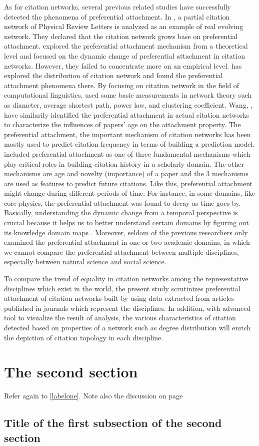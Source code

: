 \documentclass{article}
\begin{document}
As for citation networks, several previous related studies have successfully detected the phenomena of preferential attachment. In \cite{jeong2003measuring}, a partial citation network of Physical Review Letters is analyzed as an example of real evolving network. They declared that the citation network grows base on preferential attachment. \cite{wang2008measuring} explored the preferential attachment mechanism from a theoretical level and focused on the dynamic change of preferential attachment in citation networks. However, they failed to concentrate more on an empirical level. \cite{redner1998popular} has explored the distribution of citation network and found the preferential attachment phenomena there. By focusing on citation network in the field of computational linguistics, \cite{radev2009acl} used some basic measurements in network theory such as diameter, average shortest path, power law, and clustering coefficient. Wang, \cite{wang2009effect}, have similarily identified the preferential attachment in actual citation networks to characterize the influences of papers’ age on the attachment property. The preferential attachment, the important mechanism of citation networks has been mostly used to predict citation frequency in terms of building a prediction model. \cite{wang2013quantifying} included preferential attachment as one of three fundamental mechanisms which play critical roles in building citation history in a scholarly domain. The other mechanisms are age and novelty (importance) of a paper and the 3 mechanisms are used as features to predict future citations. Like this, preferential attachment might change during different periods of time. For instance, in some domains, like core physics, the preferential attachment was found to decay \cite{sinatra2015century} as time goes by. Basically, understanding the dynamic change from a temporal perspective is crucial because it helps us to better understand certain domains by figuring out its knowledge domain maps \cite{bu2016maca}. Moreover, seldom of the previous researchers only examined the preferential attachment in one or two academic domains, in which we cannot compare the preferential attachment between multiple disciplines, especially between natural science and social science.  

To compare the trend of equality in citation networks among the representative disciplines which exist in the world, the present study scrutinizes preferential attachment of citation networks built by using data extracted from articles published in journals which represent the disciplines. In addition, with advanced tool to visualize the result of analysis, the various characteristics of citation detected based on properties of a network such as degree distribution will enrich the depiction of citation topology in each discipline. 

\section{The second section}
\lipsum[6]

Refer again to \ref{labelone}. \cite{ConcreteMath}
Note also the discussion on page \pageref{labeltwo}

\subsection{Title of the first subsection of the second section}
\lipsum[7]



\end{document}
